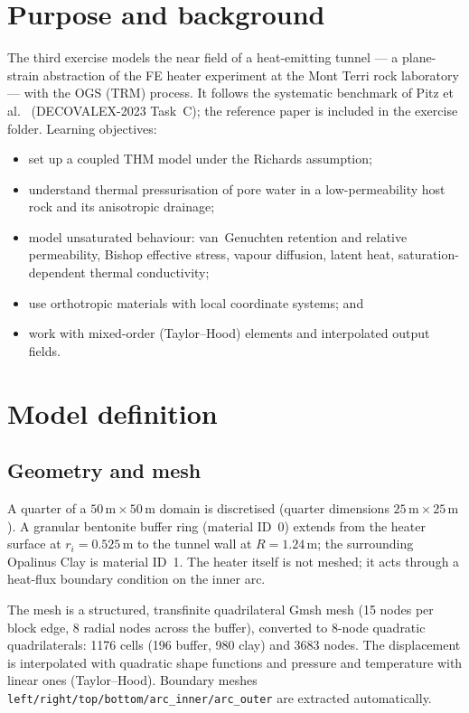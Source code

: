 \documentclass[11pt,a4paper]{tubaf-report}
\begin{document}
\section{Purpose and background}

The third exercise models the near field of a heat-emitting tunnel --- a
plane-strain abstraction of the FE heater experiment at the Mont Terri rock
laboratory --- with the OGS  (TRM)
process. It follows the systematic benchmark of Pitz et
al.~\cite{pitz2023} (DECOVALEX-2023 Task~C); the reference paper is included
in the exercise folder. Learning objectives:
\begin{itemize}[nosep]
  \item set up a coupled THM model under the Richards assumption;
  \item understand thermal pressurisation of pore water in a low-permeability
        host rock and its anisotropic drainage;
  \item model unsaturated behaviour: van~Genuchten retention and relative
        permeability, Bishop effective stress, vapour diffusion, latent heat,
        saturation-dependent thermal conductivity;
  \item use orthotropic materials with local coordinate systems; and
  \item work with mixed-order (Taylor--Hood) elements and interpolated
        output fields.
\end{itemize}

\section{Model definition}

\subsection{Geometry and mesh}

A quarter of a $50\,\mathrm m\times50\,\mathrm m$ domain is discretised
(quarter dimensions $25\,\mathrm m\times25\,\mathrm m$). A granular
bentonite buffer ring (material ID~0) extends from the heater surface at
$r_i=0.525\,\mathrm m$ to the tunnel wall at $R=1.24\,\mathrm m$; the
surrounding Opalinus Clay is material ID~1. The heater itself is not meshed;
it acts through a heat-flux boundary condition on the inner arc.

The mesh is a structured, transfinite quadrilateral Gmsh mesh (15 nodes per
block edge, 8 radial nodes across the buffer), converted to 8-node quadratic
quadrilaterals: 1176 cells (196 buffer, 980 clay) and 3683 nodes. The
displacement is interpolated with quadratic shape functions and pressure and
temperature with linear ones (Taylor--Hood). Boundary meshes
\texttt{left/right/top/bottom/arc\_inner/arc\_outer} are extracted
automatically.
\end{document}
